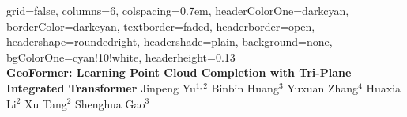 \documentclass[landscape,a0paper,fontscale=0.292]{baposter}
\begin{document}
\begin{poster}{
    grid=false,
    columns=6,
    colspacing=0.7em,
    headerColorOne=darkcyan,
    borderColor=darkcyan,
    textborder=faded,
    headerborder=open,
    headershape=roundedright,
    headershade=plain,
    background=none,
    bgColorOne=cyan!10!white,
    headerheight=0.13\textheight
}
{
    \makebox[0.005\textwidth]{} 
    \makebox[0.005\textwidth]{} 
    \makebox[0.005\textwidth]{}
}
{
    \\[0.3em]\sc\huge\bf \textcolor{ctitle}{GeoFormer}: Learning Point Cloud Completion with Tri-Plane Integrated Transformer
}
{
    \vspace{0.3em} Jinpeng Yu$^{1,2}$ \enspace Binbin Huang$^3$ \enspace Yuxuan Zhang$^4$ \enspace Huaxia Li$^2$ \enspace Xu Tang$^2$ \enspace Shenghua Gao$^3$ \\[0.2em]
}
\end{poster}
\end{document}
